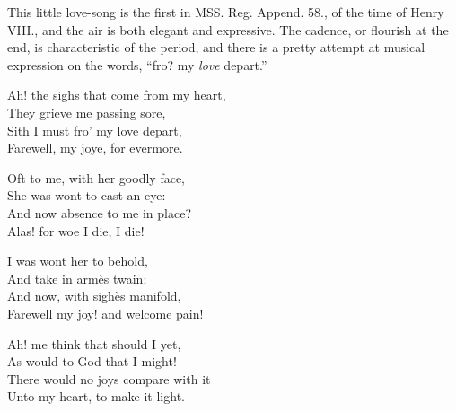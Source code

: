 \pagebreak



This little love-song is the first in MSS. Reg. Append. 58., of the time of
Henry VIII., and the air is both elegant and expressive. The cadence, or flourish
at the end, is characteristic of the period, and there is a pretty attempt at
musical expression on the words, “fro? my \textit{love} depart.”

\noindent\begin{minipage}{\textwidth}

\end{minipage}

\settowidth{\versewidth}{Farewell my joy! and welcome pain!}
\begin{dcverse}\begin{altverse}
Ah! the sighs that come from my heart,\\
They grieve me passing sore,\\
Sith I must fro’ my love depart,\\
Farewell, my joye, for evermore.
\end{altverse}

\begin{altverse}
Oft to me, with her goodly face,\\
She was wont to cast an eye:\\
And now absence to me in place?\\
Alas! for woe I die, I die!
\end{altverse}

\begin{altverse}
I was wont her to behold,\\
And take in armès twain;\\
And now, with sighès manifold,\\
Farewell my joy! and welcome pain!
\end{altverse}

\begin{altverse}
Ah! me think that should I yet,\\
As would to God that I might!\\
There would no joys compare with it\\
Unto my heart, to make it light.
\end{altverse}
\end{dcverse}


